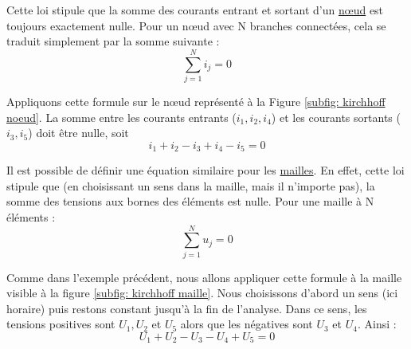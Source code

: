\documentclass[12pt,a4paper]{article}
\begin{document}
\begin{boite}
	 Cette loi stipule que la somme des courants entrant et sortant d'un \uline{n\oe ud} est toujours exactement nulle. Pour un n\oe ud avec N branches connectées, cela se traduit simplement par la somme {suivante :}
	\begin{equation}
		\sum_{j=1}^N i_j = 0
	\end{equation}
\end{boite}
\begin{exemple}
	Appliquons cette formule sur le n\oe ud représenté à la Figure \ref{subfig: kirchhoff noeud}. La somme entre les courants entrants ($i_1,i_2, i_4$) et les courants sortants ($i_3, i_5$) doit être nulle, soit 
	\[i_1 + i_2 - i_3 + i_4 - i_5 = 0\]
\end{exemple}
\begin{boite}
	 Il est possible de définir une équation similaire pour les \uline{mailles}. En effet, cette loi stipule que (en choisissant un sens dans la maille, mais il n'importe pas), la somme des tensions aux bornes des éléments est nulle. Pour une maille à N éléments :
	\begin{equation}
		\sum_{j=1}^N u_j = 0
	\end{equation}
\end{boite}
\begin{exemple}
	Comme dans l'exemple précédent, nous allons appliquer cette formule à la maille visible à la figure \ref{subfig: kirchhoff maille}. Nous choisissons d'abord un sens (ici horaire) puis restons constant jusqu'à la fin de l'analyse. Dans ce sens, les tensions positives sont $U_1, U_2$ et $U_5$ alors que les négatives sont $U_3$ et $U_4$. Ainsi :
	\[U_1 +U_2 - U_3 - U_4 + U_5 = 0\]
\end{exemple}
\end{document}
